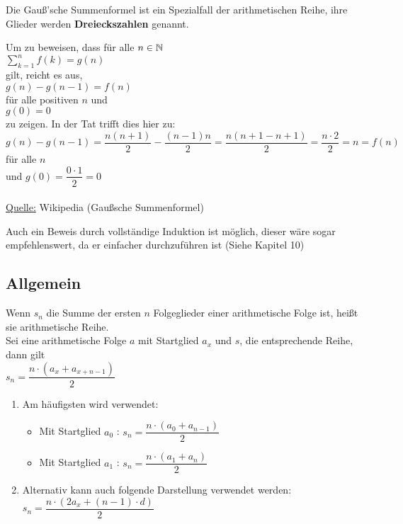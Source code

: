 \documentclass[../MAIN/main.tex]{subfiles}
\begin{document}
\begin{Bemerkung}
Die Gauß'sche Summenformel ist ein Spezialfall der arithmetischen Reihe, ihre Glieder werden \textbf{Dreieckszahlen} genannt.
\end{Bemerkung}

\begin{Beweis}
Um zu beweisen, dass für alle $n\in\mathbb{N}$\\
$\sum\limits_{k=1}^{n}f(k)=g(n)$\\
 gilt, reicht es aus, \\
$g(n)-g(n-1)=f(n)$\\
 für alle positiven $n$ und\\
 $g(0)=0$\\
 zu zeigen. In der Tat trifft dies hier zu: \\
$g(n)-g(n-1)=\dfrac{n(n+1)}{2}-\dfrac{(n-1)n}{2}=\dfrac{n(n+1-n+1)}{2}=\dfrac{n\cdot 2}{2}=n=f(n)$ \\
für alle $n$ \\
und $g(0)=\dfrac{0\cdot 1}{2}=0$\\
\\
\underline{Quelle:} Wikipedia (Gaußsche Summenformel)\\
\end{Beweis}
\begin{Bemerkung}
Auch ein Beweis durch vollständige Induktion ist möglich, dieser wäre sogar empfehlenswert, da er einfacher durchzuführen ist (Siehe Kapitel 10)
\end{Bemerkung}


	\subsection{Allgemein}

\begin{Definition}
Wenn $s_{n}$ die Summe der ersten $n$ Folgeglieder einer arithmetische Folge ist, heißt sie arithmetische Reihe.\\
Sei eine arithmetische Folge $a$ mit Startglied $a_{x}$ und $s$, die entsprechende Reihe, dann gilt\\
$s_{n}=\dfrac{n\cdot(a_{x}+a_{x+n-1})}{2}$
\end{Definition}

\begin{Bemerkung}
\begin{enumerate}
\item Am häufigsten wird verwendet:
\begin{itemize}
\item Mit Startglied $a_{0}$ : $s_{n}=\dfrac{n\cdot(a_{0}+a_{n-1})}{2}$
\item Mit Startglied $a_{1}$ : $s_{n}=\dfrac{n\cdot(a_{1}+a_{n})}{2}$
\end{itemize}
\item Alternativ kann auch folgende Darstellung verwendet werden:\\
$s_{n}=\dfrac{n\cdot(2a_{x}+(n-1)\cdot d)}{2}$
\end{enumerate}
\end{Bemerkung}
\end{document}
